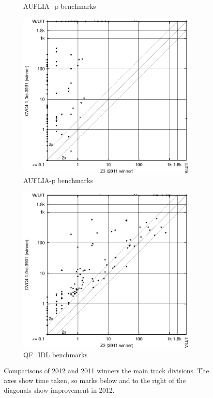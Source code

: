 \documentclass{llncs}
\begin{document}
\begin{figure}[ht]
\begin{subfigure}{0.45\textwidth}
	   \caption{AUFLIA+p benchmarks}
	\end{subfigure}	
\begin{subfigure}{0.45\textwidth}
	   \includegraphics[width=1\textwidth]{AUFLIA-p-scatter-improvement.eps}
	   \caption{AUFLIA-p benchmarks}
	\end{subfigure}	
\begin{subfigure}{0.45\textwidth}
	   \includegraphics[width=1\textwidth]{QF_IDL-scatter-improvement.eps}
	   \caption{QF\_IDL benchmarks}
	\end{subfigure}	
\caption{Comparisons of 2012 and 2011 winners the main track divisions. The axes show time taken, so marks below and to the right of the diagonals show improvement in 2012.}
\label{Comparisons}
\end{figure}
\end{document}
